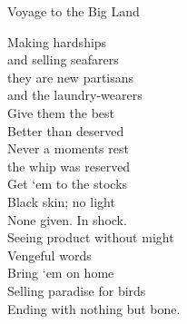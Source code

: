 Voyage to the Big Land

Making hardships\\
and selling seafarers\\
they are new partisans\\
and the laundry-wearers\\

Give them the best\\
Better than deserved\\
Never a moments rest\\
the whip was reserved\\

Get `em to the stocks\\
Black skin; no light\\
None given. In shock.\\
Seeing product without might\\

Vengeful words\\
Bring `em on home\\
Selling paradise for birds\\
Ending with nothing but bone.\\

